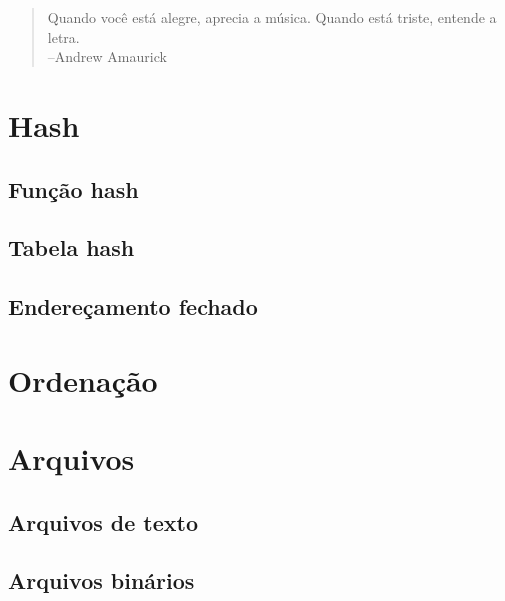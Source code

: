 \documentclass[oneside,11pt]{memoir} %
\begin{document}
\begin{quote}
Quando você está alegre, aprecia a música. Quando está triste, entende a letra.\\
--Andrew Amaurick
\end{quote}

\part{Hash}

\chapter{Função hash}


\chapter{Tabela hash}

\chapter{Endereçamento fechado}


\part{Ordenação}


\part{Arquivos}

\chapter{Arquivos de texto}

\chapter{Arquivos binários}


\end{document}
